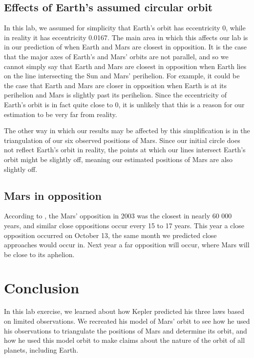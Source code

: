 \documentclass[11pt]{article}
\begin{document}
\subsection*{Effects of Earth's assumed circular orbit}
In this lab, we assumed for simplicity that Earth's orbit has eccentricity 0, while in reality it has eccentricity 0.0167.
The main area in which this affects our lab is in our prediction of when Earth and Mars are closest in opposition.
It is the case that the major axes of Earth's and Mars' orbits are not parallel, and so we cannot simply say that Earth and Mars are closest in opposition when Earth lies on the line intersecting the Sun and Mars' perihelion.
For example, it could be the case that Earth and Mars are closer in opposition when Earth is at its perihelion and Mars is slightly past its perihelion.  
Since the eccentricity of Earth's orbit is in fact quite close to 0, it is unlikely that this is a reason for our estimation to be very far from reality.

The other way in which our results may be affected by this simplification is in the triangulation of our six observed positions of Mars.
Since our initial circle does not reflect Earth's orbit in reality, the points at which our lines intersect Earth's orbit might be slightly off, meaning our estimated positions of Mars are also slightly off.


\subsection*{Mars in opposition}
According to \cite{nasa-mars3}, the Mars' opposition in 2003 was the closest in nearly 60 000 years, and similar close oppositions occur every 15 to 17 years.
This year a close opposition occurred on October 13, the same month we predicted close approaches would occur in.
Next year a far opposition will occur, where Mars will be close to its aphelion.


\section{Conclusion}
In this lab exercise, we learned about how Kepler predicted his three laws based on limited observations.
We recreated his model of Mars' orbit to see how he used his observations to triangulate the positions of Mars and determine its orbit, and how he used this model orbit to make claims about the nature of the orbit of all planets, including Earth.


\printbibliography
\end{document}
